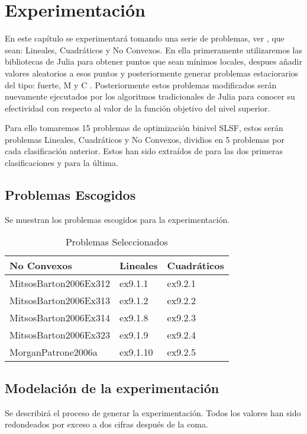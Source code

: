 \chapter{Experimentación}
En este capítulo se experimentará tomando una serie de problemas, ver \cite{BolibTestProblems}, 
que sean: Lineales, Cuadráticos y No Convexos. En ella primeramente utilizaremos las bibliotecas de Julia
para obtener puntos que sean mínimos locales, despues añadir valores aleatorios a esos puntos y posteriormente 
generar problemas estaciorarios del tipo: fuerte, M y C . Posteriormente estos problemas modificados serán nuevamente
ejecutados por los algoritmos tradicionales de Julia para conocer su efectividad con respecto al valor de la función objetivo del nivel superior.


Para ello tomaremos 15 problemas de optimización binivel SLSF, estos serán problemas 
Lineales, Cuadráticos y No Convexos, dividios en 5 problemas por cada clasificación anterior.
Estos han sido extraídos de \cite{Floudas1999HandbookOT} para las dos primeras clasificaciones y \cite{BolibTestProblems} para la última.

\newpage
\section{Problemas Escogidos}
Se muestran los problemas escogidos para la experimentación.

\begin{table}[h!]
\centering
\caption{Problemas Seleccionados}
\begin{tabular}{ | m{5cm} | m{5cm} | m{5cm} | }
  
  \hline
  \textbf{No Convexos} & \textbf{Lineales} & \textbf{Cuadráticos} \\
  \hline
  MitsosBarton2006Ex312 & ex9.1.1 & ex9.2.1 \\
  \hline
  MitsosBarton2006Ex313 & ex9.1.2 & ex9.2.2 \\
  \hline
  MitsosBarton2006Ex314 & ex9.1.8 & ex9.2.3\\
  \hline
  MitsosBarton2006Ex323 & ex9.1.9 & ex9.2.4\\
  \hline
  MorganPatrone2006a & ex9.1.10 & ex9.2.5 \\
  \hline
\end{tabular}
\end{table}



\newpage
\section{Modelación de la experimentación}
Se describirá el proceso de generar la experimentación. 
Todos los valores han sido redondeados por exceso a dos cifras después de la coma. 

